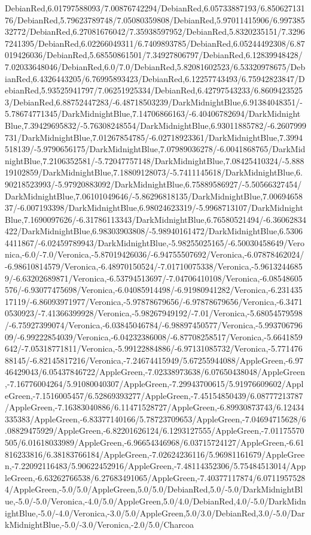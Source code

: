 {\begin{tikzternal}
DebianRed,6.01797588093/7.00876742294/DebianRed,6.05733887193/6.85062713176/DebianRed,5.79623789748/7.05080359808/DebianRed,5.97011415906/6.99738532772/DebianRed,6.27081676042/7.35938597952/DebianRed,5.8320235151/7.32967241395/DebianRed,6.02266049311/6.7409893785/DebianRed,6.05244492308/6.87019426036/DebianRed,5.68550861501/7.34927806797/DebianRed,6.12839948428/7.02033648046/DebianRed,6.0/7.0/DebianRed,5.82081602523/6.53320978675/DebianRed,6.4326443205/6.76995893423/DebianRed,6.12257743493/6.75942823847/DebianRed,5.93525941797/7.06251925334/DebianRed,6.42797543233/6.86094235253/DebianRed,6.88752447283/-6.48718503239/DarkMidnightBlue,6.91384048351/-5.78674771345/DarkMidnightBlue,7.14706866163/-6.40406782694/DarkMidnightBlue,7.39429695832/-5.76308248554/DarkMidnightBlue,6.93011885782/-6.2607999731/DarkMidnightBlue,7.01267854785/-6.02718923361/DarkMidnightBlue,7.3994518139/-5.9790656175/DarkMidnightBlue,7.07989036278/-6.0041868765/DarkMidnightBlue,7.2106352581/-5.72047757148/DarkMidnightBlue,7.08425410324/-5.88819102859/DarkMidnightBlue,7.18809128073/-5.7411145618/DarkMidnightBlue,6.90218523993/-5.97920883092/DarkMidnightBlue,6.75889586927/-5.50566327454/DarkMidnightBlue,7.06101049646/-5.86296818135/DarkMidnightBlue,7.0069465837/-6.007193398/DarkMidnightBlue,6.98024623319/-5.9968713107/DarkMidnightBlue,7.1690097626/-6.31786113343/DarkMidnightBlue,6.76580521494/-6.36062834422/DarkMidnightBlue,6.98303903808/-5.98940161472/DarkMidnightBlue,6.53064411867/-6.02459789943/DarkMidnightBlue,-5.98255025165/-6.50030458649/Veronica,-6.0/-7.0/Veronica,-5.87019426036/-6.94755507692/Veronica,-6.07878462024/-6.98610814579/Veronica,-6.48970150524/-7.01710075338/Veronica,-5.96132446859/-6.63202689871/Veronica,-6.53794513697/-7.04706410108/Veronica,-6.08548605576/-6.93077475698/Veronica,-6.04085914498/-6.91980941282/Veronica,-6.23143517119/-6.86093971977/Veronica,-5.97878679656/-6.97878679656/Veronica,-6.34710530923/-7.41366399928/Veronica,-5.98267949192/-7.01/Veronica,-5.68054579598/-6.75927399074/Veronica,-6.03845046784/-6.98897450577/Veronica,-5.99370679609/-6.99222854039/Veronica,-6.04232386008/-6.87708258517/Veronica,-5.6641859642/-7.05318771811/Veronica,-5.99122884886/-6.97131085732/Veronica,-5.77147688145/-6.82145817216/Veronica,-7.24674415949/5.67255944088/AppleGreen,-6.9746429043/6.05437846722/AppleGreen,-7.02338973638/6.07650438048/AppleGreen,-7.16776004264/5.91080040307/AppleGreen,-7.29943700615/5.91976609602/AppleGreen,-7.1516005457/6.52869393277/AppleGreen,-7.45154850439/6.08777213787/AppleGreen,-7.16383040886/6.11471528727/AppleGreen,-6.89930873743/6.12434335383/AppleGreen,-6.83377140166/5.78723709653/AppleGreen,-7.04694715628/6.08829475929/AppleGreen,-6.82201626124/6.1293127555/AppleGreen,-7.01175570505/6.01618033989/AppleGreen,-6.96654346968/6.03715724127/AppleGreen,-6.61816233816/6.38183766184/AppleGreen,-7.02624236116/5.96981161679/AppleGreen,-7.22092116483/5.90622452916/AppleGreen,-7.48114352306/5.75484513014/AppleGreen,-6.63262766538/6.27683491065/AppleGreen,-7.40377117874/6.07119575284/AppleGreen,-5.0/5.0/AppleGreen,5.0/5.0/DebianRed,5.0/-5.0/DarkMidnightBlue,-5.0/-5.0/Veronica,-4.0/5.0/AppleGreen,5.0/4.0/DebianRed,4.0/-5.0/DarkMidnightBlue,-5.0/-4.0/Veronica,-3.0/5.0/AppleGreen,5.0/3.0/DebianRed,3.0/-5.0/DarkMidnightBlue,-5.0/-3.0/Veronica,-2.0/5.0/Charcoa
\end{tikzternal}}
